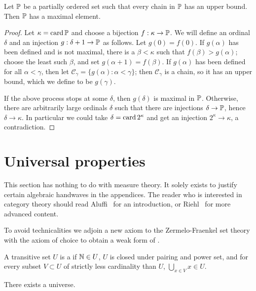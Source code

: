 \begin{theorem}
Let $\mathbb{P}$ be a partially ordered set such that every chain in $\mathbb{P}$ has an upper bound.
Then $\mathbb{P}$ has a maximal element.
\end{theorem}
\begin{proof}
Let $\kappa = \operatorname{card} \mathbb{P}$ and choose a bijection $f: \kappa \to \mathbb{P}$.
We will define an ordinal $\delta$ and an injection $g: \delta + 1 \to \mathbb{P}$ as follows.
Let $g(0) = f(0)$. If $g(\alpha)$ has been defined and is not maximal, there is a $\beta < \kappa$ such that $f(\beta) > g(\alpha)$; choose the least such $\beta$, and set $g(\alpha + 1) = f(\beta)$.
If $g(\alpha)$ has been defined for all $\alpha < \gamma$, then let $\mathcal C_{\gamma} = \{g(\alpha): \alpha < \gamma\}$; then $\mathcal C_\gamma$ is a chain, so it has an upper bound, which we define to be $g(\gamma)$.

If the above process stops at some $\delta$, then $g(\delta)$ is maximal in $\mathbb{P}$.
Otherwise, there are arbitrarily large ordinals $\delta$ such that there are injections $\delta \to \mathbb{P}$, hence $\delta \to \kappa$.
In particular we could take $\delta = \operatorname{card} 2^\kappa$ and get an injection $2^{\kappa} \to \kappa$, a contradiction.
\end{proof}

\section{Universal properties}
This section has nothing to do with measure theory.
It solely exists to justify certain algebraic handwaves in the appendices.
The reader who is interested in category theory should read Aluffi~\cite{aluffi2009algebra} for an introduction, or Riehl~\cite{riehl2017category} for more advanced content.

\begin{subsec}
To avoid technicalities we adjoin a new axiom to the Zermelo-Fraenkel set theory with the axiom of choice to obtain a weak form of .
\end{subsec}

\begin{definition}
A transitive set $U$ is a  if $\mathbb{N} \in U$, $U$ is closed under pairing and power set, and for every subset $V \subset U$ of strictly less cardinality than $U$, $\bigcup_{x \in V} x \in U$.
\end{definition}

\begin{axiom}[universe]
There exists a universe.
\end{axiom}

